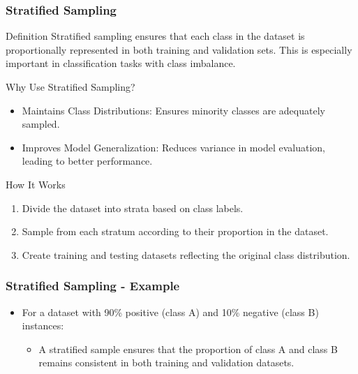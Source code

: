 \documentclass[aspectratio=169]{beamer}
\begin{document}
\begin{frame}[fragile]
    \frametitle{Stratified Sampling}
    \begin{block}{Definition}
        Stratified sampling ensures that each class in the dataset is proportionally represented in both training and validation sets. This is especially important in classification tasks with class imbalance.
    \end{block}

    \begin{block}{Why Use Stratified Sampling?}
        \begin{itemize}
            \item Maintains Class Distributions: Ensures minority classes are adequately sampled.
            \item Improves Model Generalization: Reduces variance in model evaluation, leading to better performance.
        \end{itemize}
    \end{block}
    
    \begin{block}{How It Works}
        \begin{enumerate}
            \item Divide the dataset into strata based on class labels.
            \item Sample from each stratum according to their proportion in the dataset.
            \item Create training and testing datasets reflecting the original class distribution.
        \end{enumerate}
    \end{block}
\end{frame}

\begin{frame}[fragile]
    \frametitle{Stratified Sampling - Example}
    \begin{itemize}
        \item For a dataset with 90\% positive (class A) and 10\% negative (class B) instances:
        \begin{itemize}
            \item A stratified sample ensures that the proportion of class A and class B remains consistent in both training and validation datasets.
        \end{itemize}
    \end{itemize}
\end{frame}
\end{document}
